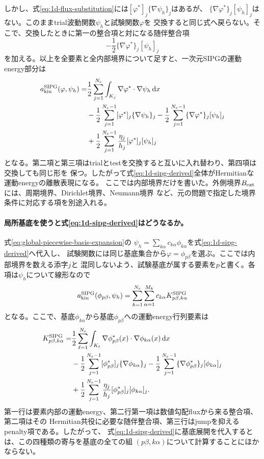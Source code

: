 \documentclass[11pt,a4paper]{article}
\newcommand{\dd}{\mathrm d}
\begin{document}
しかし、式\eqref{eq:1d-flux-substitution}には$[\varphi^*]_j\{\nabla\psi_h\}_j$はあるが、
$\{\nabla\varphi^*\}_j[\psi_h]_j$はない。このままtrial波動関数$\psi_h$と試験関数$\varphi$を
交換すると同じ式へ戻らない。そこで、交換したときに第一の整合項と対になる随伴整合項
\begin{equation}
 -\frac12\{\nabla\varphi^*\}_j[\psi_h]_j
 \label{eq:1d-adjoint-consistency}
\end{equation}
を加える。以上を全要素と全内部境界について足すと、一次元SIPGの運動energy部分は
\begin{align}
 a_{\rm kin}^{\rm SIPG}(\varphi,\psi_h)
 =&\frac12\sum_{j=1}^{N_e}\int_{K_j}
 \nabla\varphi^*\cdot\nabla\psi_h\,\dd x \notag\\
 &-\frac12\sum_{j=1}^{N_e-1}[\varphi^*]_j\{\nabla\psi_h\}_j
 -\frac12\sum_{j=1}^{N_e-1}\{\nabla\varphi^*\}_j[\psi_h]_j \notag\\
 &+\frac12\sum_{j=1}^{N_e-1}\frac{\eta_j}{h_j}
 [\varphi^*]_j[\psi_h]_j
 \label{eq:1d-sipg-derived}
\end{align}
となる。第二項と第三項はtrialとtestを交換すると互いに入れ替わり、第四項は交換しても同じ形を
保つ。したがって式\eqref{eq:1d-sipg-derived}全体がHermitianな運動energyの離散表現になる。
ここでは内部境界だけを書いた。外側境界$B_{\rm ext}$には、周期境界、Dirichlet境界、Neumann境界
など、元の問題で指定した境界条件に対応する項を別途入れる。

\paragraph{局所基底を使うと式\eqref{eq:1d-sipg-derived}はどうなるか。}
式\eqref{eq:global-piecewise-basis-expansion}の
$\psi_h=\sum_{k\alpha}c_{k\alpha}\phi_{k\alpha}$を式\eqref{eq:1d-sipg-derived}へ代入し、
試験関数には同じ基底集合から$\varphi=\phi_{p\beta}$を選ぶ。ここでは内部境界を数える添字$j$と
混同しないよう、試験基底が属する要素を$p$と書く。各項は$\psi_h$について線形なので
\begin{equation}
 a_{\rm kin}^{\rm SIPG}(\phi_{p\beta},\psi_h)
 =\sum_{k=1}^{N_e}\sum_{\alpha=1}^{M_k}
 c_{k\alpha}K^{\rm SIPG}_{p\beta,k\alpha}
 \label{eq:basis-expanded-sipg-action}
\end{equation}
となる。ここで、基底$\phi_{k\alpha}$から基底$\phi_{p\beta}$への運動energy行列要素は
\begin{align}
 K^{\rm SIPG}_{p\beta,k\alpha}
 =&\frac12\sum_{\ell=1}^{N_e}\int_{K_\ell}
 \nabla\phi_{p\beta}^*(x)\cdot\nabla\phi_{k\alpha}(x)\,\dd x \notag\\
 &-\frac12\sum_{j=1}^{N_e-1}
 [\phi_{p\beta}^*]_j\{\nabla\phi_{k\alpha}\}_j
 -\frac12\sum_{j=1}^{N_e-1}
 \{\nabla\phi_{p\beta}^*\}_j[\phi_{k\alpha}]_j \notag\\
 &+\frac12\sum_{j=1}^{N_e-1}\frac{\eta_j}{h_j}
 [\phi_{p\beta}^*]_j[\phi_{k\alpha}]_j .
 \label{eq:sipg-kinetic-matrix-element}
\end{align}
第一行は要素内部の運動energy、第二行第一項は数値勾配fluxから来る整合項、第二項はその
Hermitian共役に必要な随伴整合項、第三行はjumpを抑えるpenalty項である。したがって、
式\eqref{eq:1d-sipg-derived}に基底展開を代入するとは、この四種類の寄与を基底の全ての組
$(p\beta,k\alpha)$について計算することにほかならない。
\end{document}
